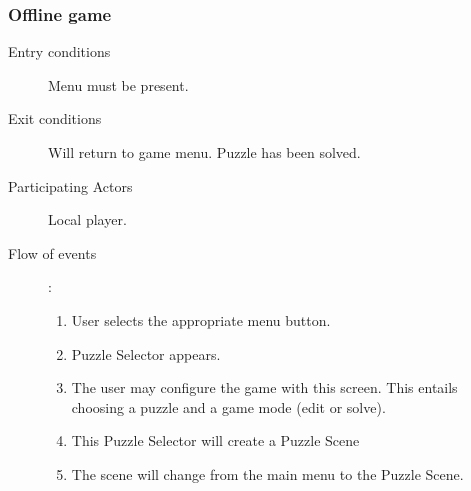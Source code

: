 \documentclass[12pt]{article}
\begin{document}
\begin{mdframed}
    \subsubsection{Offline game}
    \begin{description}
        \item[Entry conditions] Menu must be present.
        \item[Exit conditions] Will return to game menu. Puzzle has been
            solved.
        \item[Participating Actors] Local player.
        \item[Flow of events]:
            \begin{enumerate}
                \item User selects the appropriate menu button.
                \item Puzzle Selector appears.
                \item The user may configure the game with this screen. This
                    entails choosing a puzzle and a game mode (edit or solve).
                \item This Puzzle Selector will create a Puzzle Scene
                \item The scene will change from the main menu to the Puzzle
                    Scene.
            \end{enumerate}
    \end{description}
\end{mdframed}
\end{document}
